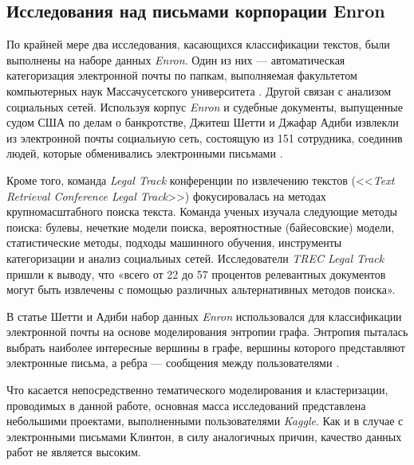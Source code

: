 \subsection{Исследования над письмами корпорации Enron}

По крайней мере два исследования, касающихся классификации текстов, были выполнены на наборе данных \textit{Enron}. Один из них --- автоматическая категоризация электронной почты по папкам, выполняемая факультетом компьютерных наук Массачусетского университета \cite{bib_5}. Другой связан с анализом социальных сетей. Используя корпус \textit{Enron} и судебные документы, выпущенные судом США по делам о банкротстве, Джитеш Шетти и Джафар Адиби извлекли из электронной почты социальную сеть, состоящую из 151 сотрудника, соединив людей, которые обменивались электронными письмами \cite{bib_6}.

Кроме того, команда \textit{Legal Track} конференции по извлечению текстов (<<\textit{Text Retrieval Conference Legal Track}>>) фокусировалась на методах крупномасштабного поиска текста. Команда ученых изучала следующие методы поиска: булевы, нечеткие модели поиска, вероятностные (байесовские) модели, статистические методы, подходы машинного обучения, инструменты категоризации и анализ социальных сетей. Исследователи \textit{TREC Legal Track}
пришли к выводу, что «всего от 22 до 57 процентов релевантных документов могут быть извлечены с помощью различных альтернативных методов поиска».

В статье Шетти и Адиби набор данных \textit{Enron} использовался для классификации электронной почты на основе моделирования энтропии графа. Энтропия пыталась выбрать наиболее интересные вершины в графе, вершины которого представляют электронные письма, а ребра --- сообщения между пользователями \cite{bib_7}.

Что касается непосредственно тематического моделирования и кластеризации, проводимых в данной работе, основная масса исследований представлена небольшими проектами, выполненными пользователями \textit{Kaggle}. Как и в случае с электронными письмами Клинтон, в силу аналогичных причин, качество данных работ не является высоким.

